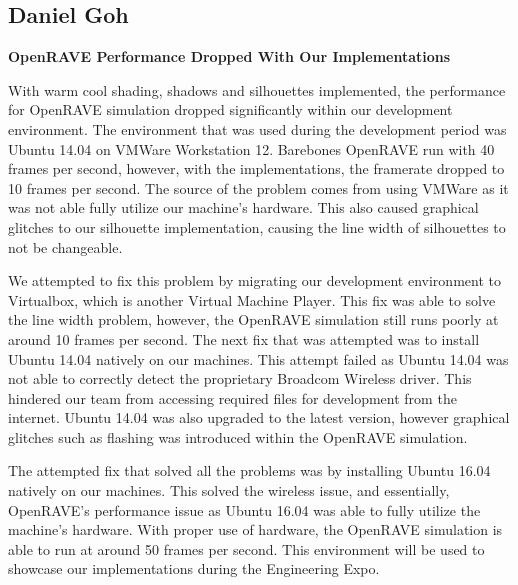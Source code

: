 \documentclass[10pt,journal,compsoc,draftclsnofoot]{IEEEtran}
\begin{document}
\begin{flushleft}
\subsection{Daniel Goh}
\textbf{OpenRAVE Performance Dropped With Our Implementations}
\par
With warm cool shading, shadows and silhouettes implemented, the performance for OpenRAVE simulation dropped significantly within our development environment.
The environment that was used during the development period was Ubuntu 14.04 on VMWare Workstation 12.
Barebones OpenRAVE run with 40 frames per second, however, with the implementations, the framerate dropped to 10 frames per second.
The source of the problem comes from using VMWare as it was not able fully utilize our machine's hardware.
This also caused graphical glitches to our silhouette implementation, causing the line width of silhouettes to not be changeable. 
\vspace{3mm}

We attempted to fix this problem by migrating our development environment to Virtualbox, which is another Virtual Machine Player.
This fix was able to solve the line width problem, however, the OpenRAVE simulation still runs poorly at around 10 frames per second.
The next fix that was attempted was to install Ubuntu 14.04 natively on our machines.
This attempt failed as Ubuntu 14.04 was not able to correctly detect the proprietary Broadcom Wireless driver.
This hindered our team from accessing required files for development from the internet.
Ubuntu 14.04 was also upgraded to the latest version, however graphical glitches such as flashing was introduced within the OpenRAVE simulation.
\vspace{3mm}

The attempted fix that solved all the problems was by installing Ubuntu 16.04 natively on our machines.
This solved the wireless issue, and essentially, OpenRAVE's performance issue as Ubuntu 16.04 was able to fully utilize the machine's hardware.
With proper use of hardware, the OpenRAVE simulation is able to run at around 50 frames per second.
This environment will be used to showcase our implementations during the Engineering Expo.

\newpage


\end{flushleft}
\end{document}
